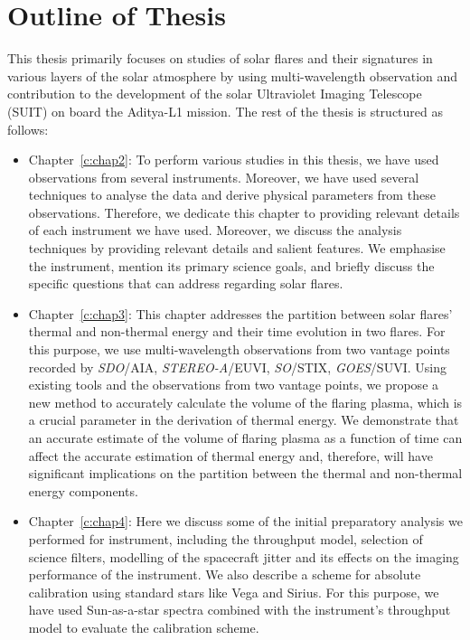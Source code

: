 \section{Outline of Thesis}\label{sec:outline}


This thesis primarily focuses on studies of solar flares and their signatures in various layers of the solar atmosphere by using multi-wavelength observation and contribution to the development of the solar Ultraviolet Imaging Telescope (SUIT) on board the Aditya-L1 mission. The rest of the thesis is structured as follows: 

\begin{itemize} 
	
	\item Chapter~\ref{c:chap2}: To perform various studies in this thesis, we have used observations from several instruments. Moreover, we have used several techniques to analyse the data and derive physical parameters from these observations. Therefore, we dedicate this chapter to providing relevant details of each instrument we have used. Moreover, we discuss the analysis techniques by providing relevant details and salient features. We emphasise the {\suit} instrument, mention its primary science goals, and briefly discuss the specific questions that {\suit} can address regarding solar flares.
	
	\item Chapter~\ref{c:chap3}: This chapter addresses the partition between solar flares' thermal and non-thermal energy and their time evolution in two flares. For this purpose, we use multi-wavelength observations from two vantage points recorded by {\it SDO}/AIA, {\it STEREO-A}/EUVI, {\it SO}/STIX, {\it GOES}/SUVI. Using existing tools and the observations from two vantage points, we propose a new method to accurately calculate the volume of the flaring plasma, which is a crucial parameter in the derivation of thermal energy. We demonstrate that an accurate estimate of the volume of flaring plasma as a function of time can affect the accurate estimation of thermal energy and, therefore, will have significant implications on the partition between the thermal and non-thermal energy components.
	
	\item Chapter~\ref{c:chap4}: Here we discuss some of the initial preparatory analysis we performed for {\suit} instrument, including the throughput model, selection of science filters, modelling of the spacecraft jitter and its effects on the imaging performance of the instrument. We also describe a scheme for absolute calibration using standard stars like Vega and Sirius. For this purpose, we have used Sun-as-a-star spectra combined with the instrument's throughput model to evaluate the calibration scheme.
	

\end{itemize}
